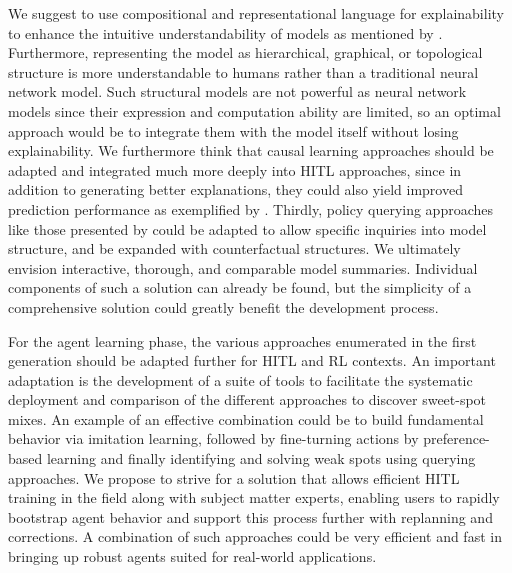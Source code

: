 \documentclass[twoside,11pt]{article}
\begin{document}
We suggest to use compositional and representational language for explainability to enhance the intuitive understandability of models as mentioned by \citet{RoyEtAl:2021:RLRoboticsChallenges}.
Furthermore, representing the model as hierarchical, graphical, or topological structure \citep{lyu2019sdrl,battaglia2018relational} is more understandable to humans rather than a traditional neural network model. Such structural models are not powerful as neural network models since their expression and computation ability are limited, so an optimal approach would be to integrate them with the model itself without losing explainability.
We furthermore think that causal learning approaches should be adapted and integrated much more deeply into HITL approaches, since in addition to generating better explanations, they could also yield improved prediction performance as exemplified by \citet{MadumalEtAl:2020:CausalRLCFs}. Thirdly, policy querying approaches like those presented by \citet{HayesShah:2017:AutonomousPolicyExplanation} could be adapted to allow specific inquiries into model structure, and be expanded with counterfactual structures.
We ultimately envision interactive, thorough, and comparable model summaries. Individual components of such a solution can already be found, but the simplicity of a comprehensive solution could greatly benefit the development process.



For the agent learning phase, the various approaches enumerated in the first generation should be adapted further for HITL and RL contexts. An important adaptation is the development of a suite of tools to facilitate the systematic deployment and comparison of the different approaches to discover sweet-spot mixes. An example of an effective combination could be to build fundamental behavior via imitation learning, followed by fine-turning actions by preference-based learning and finally identifying and solving weak spots using querying approaches. We propose to strive for a solution that allows efficient HITL training in the field along with subject matter experts, enabling users to rapidly bootstrap agent behavior and support this process further with replanning and corrections. A combination of such approaches could be very efficient and fast in bringing up robust agents suited for real-world applications.

\end{document}
